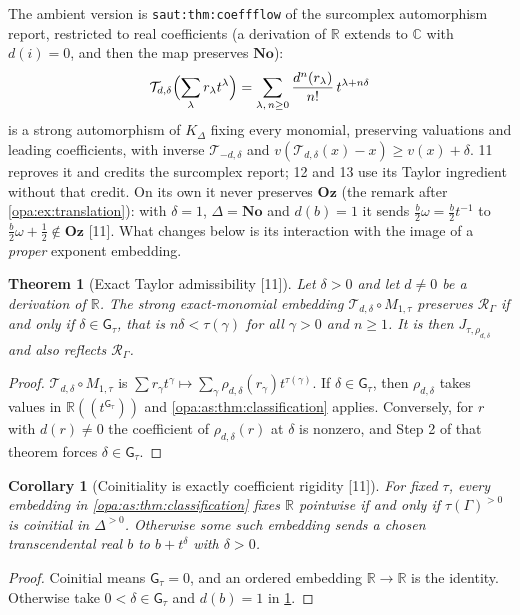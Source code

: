 \documentclass[11pt,oneside]{article}
\numberwithin{equation}{section}
\newtheorem{theorem}{Theorem}[section]
\newtheorem{corollary}[corollary]{Corollary}
\theoremstyle{definition}
\theoremstyle{remark}
\newcommand{\No}{\mathbf{No}}
\newcommand{\Oz}{\mathbf{Oz}}
\newcommand{\R}{\mathbb R}
\newcommand{\C}{\mathbb C}
\newcommand{\Hahn}[2]{#1((t^{#2}))}
\newcommand{\src}[1]{\textup{\textsf{\small[#1]}}}
\newcommand{\lbl}[1]{\nolinkurl{#1}}
\newcommand{\gap}{\mathsf G}
\begin{document}
The ambient version is \lbl{saut:thm:coeffflow} of the surcomplex automorphism report, restricted
to real coefficients (a derivation of $\R$ extends to $\C$ with $d(i)=0$, and then the map
preserves $\No$):
\begin{equation}\label{opa:as:eq:taylor}
 \mathcal T_{d,\delta}\Bigl(\sum_\lambda r_\lambda t^\lambda\Bigr)
 =\sum_{\lambda,\,n\ge0}\frac{d^n(r_\lambda)}{n!}\,t^{\lambda+n\delta}
\end{equation}
is a strong automorphism of $K_\Delta$ fixing every monomial, preserving valuations and leading
coefficients, with inverse $\mathcal T_{-d,\delta}$ and $v(\mathcal T_{d,\delta}(x)-x)\ge v(x)+\delta$.
11 reproves it and credits the surcomplex report; 12 and 13 use its Taylor ingredient without
that credit. On its own it never preserves $\Oz$ (the remark after \cref{opa:ex:translation}):
with $\delta=1$, $\Delta=\No$ and $d(b)=1$ it sends $\tfrac b2\omega=\tfrac b2t^{-1}$ to
$\tfrac b2\omega+\tfrac12\notin\Oz$ \src{11}. What changes below is its interaction with the image of a
\emph{proper} exponent embedding.

\begin{theorem}[Exact Taylor admissibility \src{11}]\label{opa:as:thm:taylorcriterion}
Let $\delta>0$ and let $d\ne0$ be a derivation of $\R$. The strong exact-monomial embedding
$\mathcal T_{d,\delta}\circ M_{1,\tau}$ preserves $\mathcal R_\Gamma$ if and only if
$\delta\in\gap_\tau$, that is $n\delta<\tau(\gamma)$ for all $\gamma>0$ and $n\ge1$. It is then
$J_{\tau,\rho_{d,\delta}}$ and also reflects $\mathcal R_\Gamma$.
\end{theorem}
\begin{proof}
$\mathcal T_{d,\delta}\circ M_{1,\tau}$ is $\sum r_\gamma t^\gamma\mapsto\sum_\gamma\rho_{d,\delta}(r_\gamma)t^{\tau(\gamma)}$. If
$\delta\in\gap_\tau$, then $\rho_{d,\delta}$ takes values in $\Hahn\R{\gap_\tau}$ and
\cref{opa:as:thm:classification} applies. Conversely, for $r$ with $d(r)\ne0$ the coefficient of
$\rho_{d,\delta}(r)$ at $\delta$ is nonzero, and Step 2 of that theorem forces $\delta\in\gap_\tau$.
\end{proof}

\begin{corollary}[Coinitiality is exactly coefficient rigidity \src{11}]\label{opa:as:cor:rigidity}
For fixed $\tau$, every embedding in \cref{opa:as:thm:classification} fixes $\R$ pointwise if and
only if $\tau(\Gamma)^{>0}$ is coinitial in $\Delta^{>0}$. Otherwise some such embedding sends a
chosen transcendental real $b$ to $b+t^\delta$ with $\delta>0$.
\end{corollary}
\begin{proof}
Coinitial means $\gap_\tau=0$, and an ordered embedding $\R\to\R$ is the identity. Otherwise take
$0<\delta\in\gap_\tau$ and $d(b)=1$ in \cref{opa:as:thm:taylorcriterion}.
\end{proof}
\end{document}
